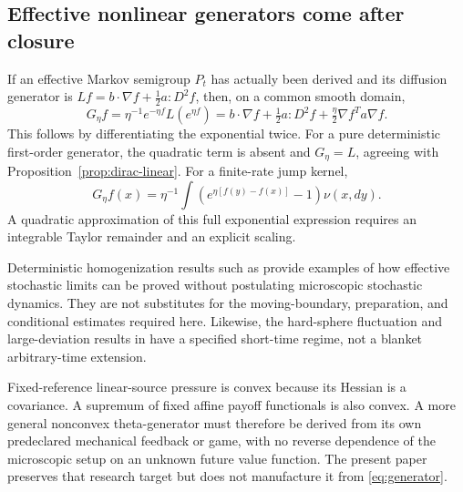 \subsection{Effective nonlinear generators come after closure}
If an effective Markov semigroup $P_t$ has actually been derived and its diffusion generator is
$Lf=b\cdot\nabla f+\frac12a:D^2f$, then, on a common smooth domain,
\begin{equation}
 G_\eta f=\eta^{-1}e^{-\eta f}L(e^{\eta f})
 =b\cdot\nabla f+\tfrac12a:D^2f+\tfrac\eta2\nabla f^Ta\nabla f.
 \label{eq:generator}
\end{equation}
This follows by differentiating the exponential twice. For a pure deterministic first-order generator, the quadratic term is absent and $G_\eta=L$, agreeing with Proposition~\ref{prop:dirac-linear}. For a finite-rate jump kernel,
\[
 G_\eta f(x)=\eta^{-1}\int(e^{\eta[f(y)-f(x)]}-1)\nu(x,dy).
\]
A quadratic approximation of this full exponential expression requires an integrable Taylor remainder and an explicit scaling.

Deterministic homogenization results such as \cite{KellyMelbourne} provide examples of how effective stochastic limits can be proved without postulating microscopic stochastic dynamics. They are not substitutes for the moving-boundary, preparation, and conditional estimates required here. Likewise, the hard-sphere fluctuation and large-deviation results in \cite{BodineauEtAl} have a specified short-time regime, not a blanket arbitrary-time extension.

Fixed-reference linear-source pressure is convex because its Hessian is a covariance. A supremum of fixed affine payoff functionals is also convex. A more general nonconvex theta-generator must therefore be derived from its own predeclared mechanical feedback or game, with no reverse dependence of the microscopic setup on an unknown future value function. The present paper preserves that research target but does not manufacture it from \eqref{eq:generator}.
\par
